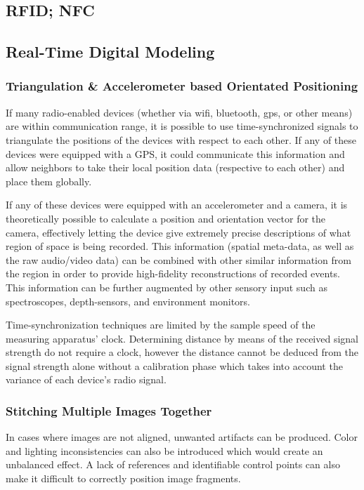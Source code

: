 \documentclass[a4paper,12pt]{report}
\begin{document}
\subsection{RFID; NFC}
\cite{5340296}
\subsection{Real-Time Digital Modeling}

\subsubsection{Triangulation \& Accelerometer based Orientated Positioning}

If many radio-enabled devices (whether via wifi, bluetooth, gps, or other means) are within communication range, it is possible to use time-synchronized signals to triangulate the positions of the devices with respect to each other. If any of these devices were equipped with a GPS, it could communicate this information and allow neighbors to take their local position data (respective to each other) and place them globally.

If any of these devices were equipped with an accelerometer and a camera, it is theoretically possible to calculate a position and orientation vector for the camera, effectively letting the device give extremely precise descriptions of what region of space is being recorded. This information (spatial meta-data, as well as the raw audio/video data) can be combined with other similar information from the region in order to provide high-fidelity reconstructions of recorded events. This information can be further augmented by other sensory input such as spectroscopes, depth-sensors, and environment monitors.

Time-synchronization techniques are limited by the sample speed of the measuring apparatus' clock. Determining distance by means of the received signal strength do not require a clock, however the distance cannot be deduced from the signal strength alone without a calibration phase which takes into account the variance of each device's radio signal.

\subsubsection{Stitching Multiple Images Together}
In cases where images are not aligned, unwanted artifacts can be produced. Color and lighting inconsistencies can also be introduced which would create an unbalanced effect. A lack of references and identifiable control points can also make it difficult to correctly position image fragments. \cite{4359344,5397590}
\end{document}
